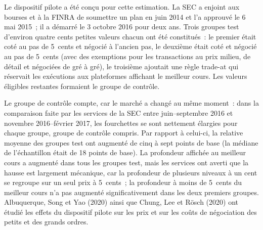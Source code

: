 Le dispositif pilote a été conçu pour cette estimation. La SEC a enjoint aux bourses et à la FINRA de soumettre un plan en juin 2014 et l'a approuvé le 6 mai 2015~; il a démarré
le 3 octobre 2016 pour deux ans. Trois groupes test d'environ quatre cents petites valeurs chacun ont été constitués~: le premier était coté au pas de 5~cents et négocié à l'ancien pas,
le deuxième était coté et négocié au pas de 5~cents (avec des exemptions pour les transactions au prix milieu, de détail et négociées de gré à gré), le troisième ajoutait une règle trade-at
qui réservait les exécutions aux plateformes affichant le meilleur cours. Les valeurs éligibles restantes formaient le groupe de contrôle.

Le groupe de contrôle compte, car le marché a changé au même moment~: dans la comparaison faite par les services de la SEC entre juin--septembre 2016 et novembre
2016--février 2017, les fourchettes se sont nettement élargies pour chaque groupe, groupe de contrôle compris. Par rapport à celui-ci, la  relative moyenne des groupes test
ont augmenté de cinq à sept points de base (la  médiane de l'échantillon était de 18 points de base). La profondeur affichée au meilleur cours a augmenté dans tous les groupes
test, mais les services ont averti que la hausse est largement mécanique, car la profondeur de plusieurs niveaux à un cent se regroupe sur un seul prix à 5~cents~; la profondeur
à moins de 5~cents du meilleur cours n'a pas augmenté significativement dans les deux premiers groupes. Albuquerque, Song et Yao (2020) ainsi que Chung, Lee et Rösch (2020)
ont étudié les effets du dispositif pilote sur les prix et sur les coûts de négociation des petits et des grands ordres.

